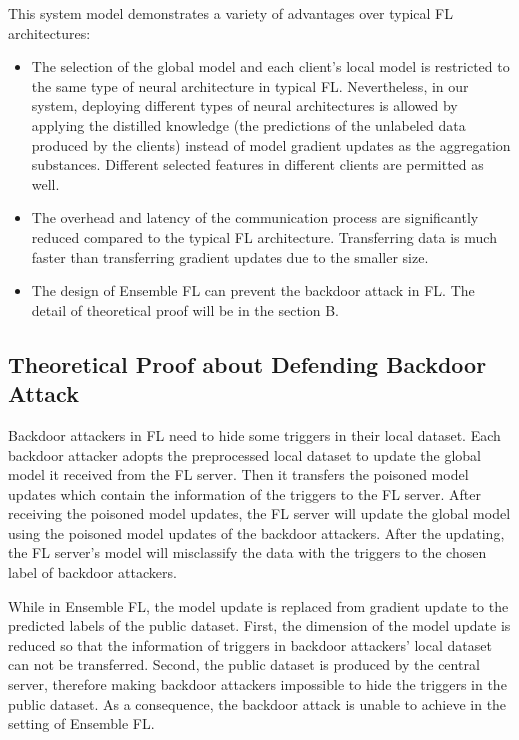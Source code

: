 \documentclass[journal]{IEEEtran}
\begin{document}
\par This system model demonstrates a variety of advantages over typical FL architectures:
\begin{itemize}

  \item The selection of the global model and each client's local model is restricted to the same type of neural architecture in typical FL. Nevertheless, in our system, deploying different types of neural architectures is allowed by applying the distilled knowledge (the predictions of the unlabeled data produced by the clients) instead of model gradient updates as the aggregation substances. Different selected features in different clients are permitted as well.
  \item The overhead and latency of the communication process are significantly reduced compared to the typical FL architecture. Transferring data is much faster than transferring gradient updates due to the smaller size. 
  \item The design of Ensemble FL can prevent the backdoor attack in FL. The detail of theoretical proof will be in the section B.
\end{itemize}
      
\subsection{Theoretical Proof about Defending Backdoor Attack}
Backdoor attackers in FL need to hide some triggers in their local dataset. Each backdoor attacker adopts the preprocessed local dataset to update the global model it received from the FL server. Then it transfers the poisoned model updates which contain the information of the triggers to the FL server. After receiving the poisoned model updates, the FL server will update the global model using the poisoned model updates of the backdoor attackers. After the updating, the FL server's model will misclassify the data with the triggers to the chosen label of backdoor attackers.
\par While in Ensemble FL, the model update is replaced from gradient update to the predicted labels of the public dataset. First, the dimension of the model update is reduced so that the information of triggers in backdoor attackers' local dataset can not be transferred. Second, the public dataset is produced by the central server, therefore making backdoor attackers impossible to hide the triggers in the public dataset. As a consequence, the backdoor attack is unable to achieve in the setting of Ensemble FL.
\end{document}
